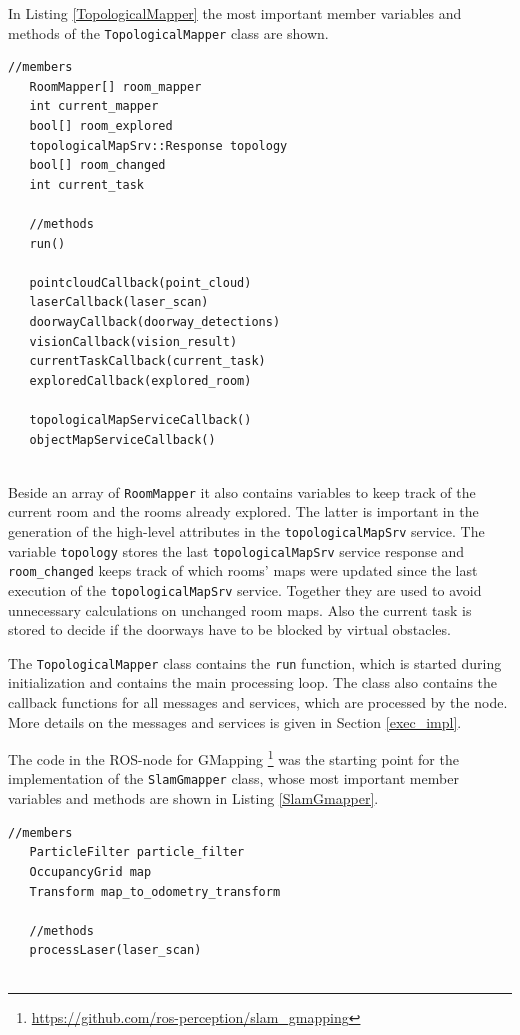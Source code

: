 In Listing \ref{TopologicalMapper} the most important member variables and methods of the \texttt{TopologicalMapper} class are shown. \newline
\begin{minipage}{\linewidth}
\begin{lstlisting}[caption=\texttt{TopologicalMapper} class,frame=single, label=TopologicalMapper]
   //members
   RoomMapper[] room_mapper
   int current_mapper
   bool[] room_explored
   topologicalMapSrv::Response topology
   bool[] room_changed
   int current_task
   
   //methods
   run()
   
   pointcloudCallback(point_cloud)
   laserCallback(laser_scan)
   doorwayCallback(doorway_detections)
   visionCallback(vision_result)
   currentTaskCallback(current_task)
   exploredCallback(explored_room)
   
   topologicalMapServiceCallback()
   objectMapServiceCallback()
   
\end{lstlisting}
\end{minipage} 
Beside an array of \texttt{RoomMapper} it also contains variables to keep track of the current room and the rooms already explored. The latter is important in the generation of the high-level attributes in the \texttt{topologicalMapSrv} service. The variable \texttt{topology} stores the last \texttt{topologicalMapSrv} service response and \texttt{room{\_}changed} keeps track of which rooms' maps were updated since the last execution of the \texttt{topologicalMapSrv} service. Together they are used to avoid unnecessary calculations on unchanged room maps. Also the current task is stored to decide if the doorways have to be blocked by virtual obstacles.

The \texttt{TopologicalMapper} class contains the \texttt{run} function, which is started during initialization and contains the main processing loop. The class also contains the callback functions for all messages and services, which are processed by the node. More details on the messages and services is given in Section \ref{exec_impl}.

The code in the ROS-node for GMapping \footnote{\url{https://github.com/ros-perception/slam_gmapping}} was the starting point for the implementation of the \texttt{SlamGmapper} class, whose most important member variables and methods are shown in Listing \ref{SlamGmapper}.

\begin{minipage}{\linewidth}
\begin{lstlisting}[caption=\texttt{SlamGmapper} class,frame=single, label=SlamGmapper]
   //members
   ParticleFilter particle_filter 
   OccupancyGrid map
   Transform map_to_odometry_transform
   
   //methods
   processLaser(laser_scan)
   
\end{lstlisting}
\end{minipage}

